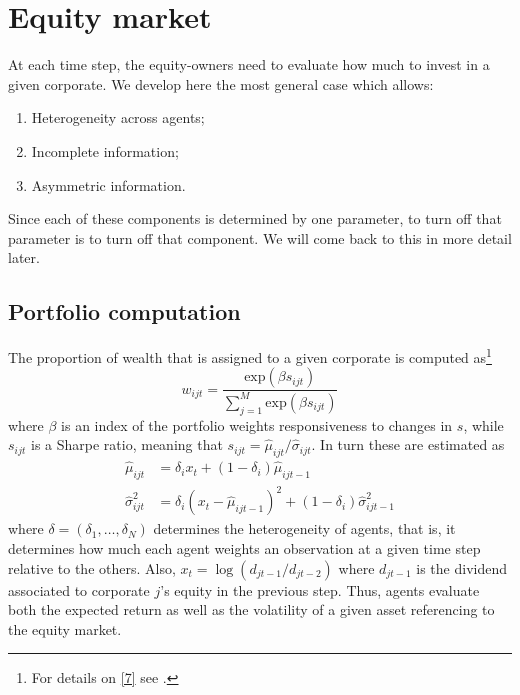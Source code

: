 \documentclass[11pt]{article}
\begin{document}
\section{Equity market}\label{section2}
At each time step, the equity-owners need to evaluate how much to invest in a given corporate. We develop here the most general case which allows:
\begin{enumerate}
	\item Heterogeneity across agents;
	\item Incomplete information;
	\item Asymmetric information.
\end{enumerate}
Since each of these components is determined by one parameter, to turn off that parameter is to turn off that component. We will come back to this in more detail later.

\subsection{Portfolio computation}
The proportion of wealth that is assigned to a given corporate is computed as\footnote{For details on \eqref{7} see \citet{3}.}
\begin{equation}\label{7}
	w_{ijt} = \frac{\mathrm{exp}(\beta s_{ijt})}{\sum_{j=1}^M \mathrm{exp}(\beta s_{ijt})}
\end{equation}
where $\beta$ is an index of the portfolio weights responsiveness to changes in $s$, while $s_{ijt}$ is a Sharpe ratio, meaning that $s_{ijt} = \hat{\mu}_{ijt}/\hat{\sigma}_{ijt}$. In turn these are estimated as
\begin{subequations}\label{8}
\begin{align}
	\hat{\mu}_{ijt} &= \delta_i x_t + (1-\delta_i)\hat{\mu}_{ijt-1} \label{8a}\\
	\hat{\sigma}^2_{ijt} &= \delta_i (x_t - \hat{\mu}_{ijt-1})^2 + (1-\delta_i)\hat{\sigma}^2_{ijt-1}\label{8b}
\end{align}
\end{subequations}
where $\delta = (\delta_1,\dots,\delta_N)$ determines the heterogeneity of agents, that is, it determines how much each agent weights an observation at a given time step relative to the others. Also, $x_t = \log (d_{jt-1}/d_{jt-2})$ where $d_{jt-1}$ is the dividend associated to corporate $j$'s equity in the previous step. Thus, agents evaluate both the expected return as well as the volatility of a given asset referencing to the equity market.
\end{document}
